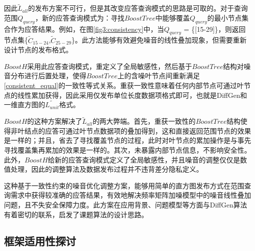 因此$\tilde{L}_{all}$的发布方案不可行，但是其改变应答查询模式的思路是可取的。对于查询范围$Q_{query}$，新的应答查询模式为：寻找$BoostTree$中能够覆盖$Q_{query}$的最小节点集合作为应答结果。例如，在图\ref{fig3:consistency}中，当$Q_{query}$ = \{[15-29]\}，则返回节点集\{$\tilde{C}_{15-24}$,$\tilde{C}_{25-29}$\}。此方法能够有效避免噪音的线性叠加现象，但需要重新设计节点的发布格式。

$BoostH$采用此应答查询模式，重定义了全局敏感性，然后基于$BoostTree$结构对噪音分布进行后置处理，使得$BoostTree$上的含噪叶节点间重新满足\ref{consistent_equal}的一致性等式关系。重获一致性意味着任何内部节点可通过叶节点的线性累加获得，因此采用仅发布单位长度数据项格式即可，也就是DiffGen和一维直方图的$\tilde{L_{unit}}$格式。

$BoostH$的这种方案解决了$\tilde{L}_{all}$的两大弊端。首先，重获一致性的$BoostTree$结构使得非叶结点的应答可通过叶节点数据项的叠加得到，这和直接返回范围节点的效果是一样的；并且，省去了寻找覆盖节点的过程，此时对叶节点的累加操作是与事先寻找覆盖集再累加的效果是一样的。其次，未暴露内部节点信息，不影响安全性。此外，$BoostH$给新的应答查询模式定义了全局敏感性，并且噪音的调整仅仅是数值处理，因此的调整算法及数据发布过程并不违背差分隐私定义。

这种基于一致性约束的噪音优化调整方案，能够用简单的直方图发布方式在范围查询需求中获得较准确的应答结果，有效地解决频率矩阵加噪模型中的噪音线性叠加问题，且不失安全保障力度。此方案在应用背景、问题模型等方面与DiffGen算法有着密切的联系，启发了课题算法的设计思路。




\subsection{框架适用性探讨}

